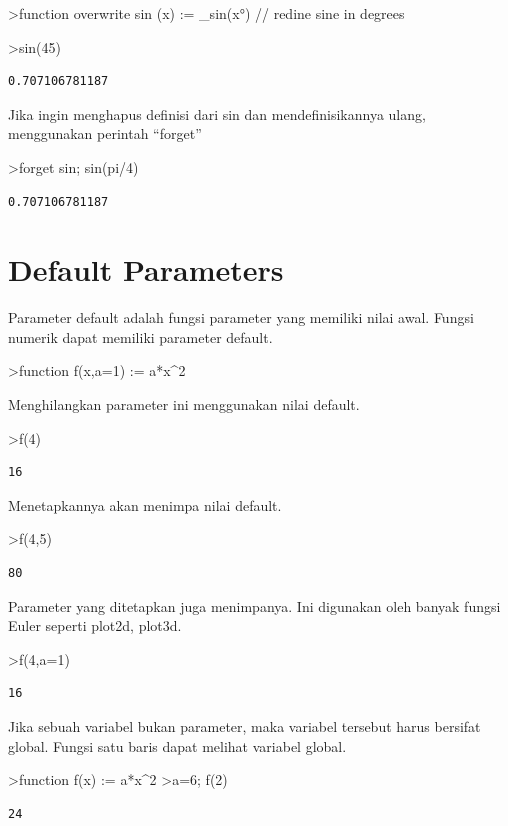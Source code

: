 \documentclass[
]{book}
\begin{document}
\textgreater function overwrite sin (x) := \_sin(x°) // redine sine in degrees

\textgreater sin(45)

\begin{verbatim}
0.707106781187
\end{verbatim}

Jika ingin menghapus definisi dari sin dan mendefinisikannya ulang, menggunakan perintah ``forget''

\textgreater forget sin; sin(pi/4)

\begin{verbatim}
0.707106781187
\end{verbatim}

\section{Default Parameters}\label{default-parameters}

Parameter default adalah fungsi parameter yang memiliki nilai awal. Fungsi numerik dapat memiliki parameter default.

\textgreater function f(x,a=1) := a*x\^{}2

Menghilangkan parameter ini menggunakan nilai default.

\textgreater f(4)

\begin{verbatim}
16
\end{verbatim}

Menetapkannya akan menimpa nilai default.

\textgreater f(4,5)

\begin{verbatim}
80
\end{verbatim}

Parameter yang ditetapkan juga menimpanya. Ini digunakan oleh banyak fungsi Euler seperti plot2d, plot3d.

\textgreater f(4,a=1)

\begin{verbatim}
16
\end{verbatim}

Jika sebuah variabel bukan parameter, maka variabel tersebut harus bersifat global. Fungsi satu baris dapat melihat variabel global.

\textgreater function f(x) := a*x\^{}2 \textgreater a=6; f(2)

\begin{verbatim}
24
\end{verbatim}
\end{document}
